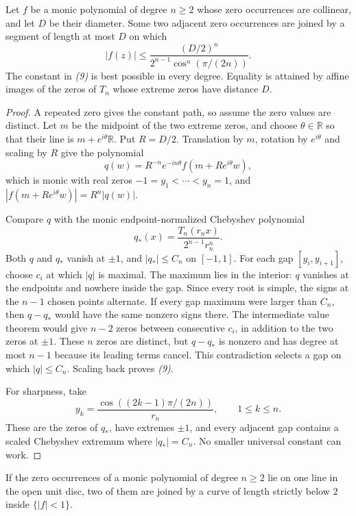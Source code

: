 \documentclass[11pt]{article}
\begin{document}
\begin{theorem}
\label{thm:sharp-collinear-diameter}
Let $f$ be a monic polynomial of degree $n\ge2$ whose zero occurrences are
collinear, and let $D$ be their diameter.  Some two adjacent zero occurrences
are joined by a segment of length at most $D$ on which
\[
 |f(z)|\le
 \frac{(D/2)^n}{2^{n-1}\cos^n(\pi/(2n))}.          \tag{9}
\]
The constant in \emph{(9)} is best possible in every degree.  Equality is
attained by affine images of the zeros of $T_n$ whose extreme zeros have
distance $D$.
\end{theorem}

\begin{proof}
A repeated zero gives the constant path, so assume the zero values are
distinct. Let $m$ be the midpoint of the two extreme zeros, and choose
$\theta\in\mathbb R$ so that their line is $m+e^{i\theta}\mathbb R$.
Put $R=D/2$. Translation by $m$, rotation by $e^{i\theta}$ and scaling
by $R$ give the polynomial
\[
 q(w)=R^{-n}e^{-in\theta}f(m+Re^{i\theta}w),
\]
which is monic with real zeros
$-1=y_1<\cdots<y_n=1$, and
$|f(m+Re^{i\theta}w)|=R^n|q(w)|$.

Compare $q$ with the monic endpoint-normalized Chebyshev polynomial
\[
 q_*(x)=\frac{T_n(r_nx)}{2^{n-1}r_n^n}.
\]
Both $q$ and $q_*$ vanish at $\pm1$, and $|q_*|\le C_n$ on
$[-1,1]$.  For each gap $[y_i,y_{i+1}]$, choose $c_i$ at which
$|q|$ is maximal. The maximum lies in the interior: $q$ vanishes at the
endpoints and nowhere inside the gap. Since every root is simple, the
signs at the $n-1$ chosen points alternate. If every gap maximum were
larger than $C_n$, then $q-q_*$ would have the same nonzero signs there.
The intermediate value theorem would give $n-2$ zeros between consecutive
$c_i$, in addition to the two zeros at $\pm1$. These $n$ zeros are distinct,
but $q-q_*$ is nonzero and has degree at most $n-1$ because its leading
terms cancel.
This contradiction selects a gap on which $|q|\le C_n$.  Scaling back proves
\emph{(9)}.

For sharpness, take
\[
 y_k=\frac{\cos((2k-1)\pi/(2n))}{r_n},
 \qquad 1\le k\le n.
\]
These are the zeros of $q_*$, have extremes $\pm1$, and every adjacent gap
contains a scaled Chebyshev extremum where $|q_*|=C_n$.  No smaller universal
constant can work.
\end{proof}

\begin{corollary}
\label{cor:collinear-erdos-1041}
If the zero occurrences of a monic polynomial of degree $n\ge2$ lie on one line
in the open unit disc, two of them are joined by a curve of length strictly
below $2$ inside $\{|f|<1\}$.
\end{corollary}
\end{document}
